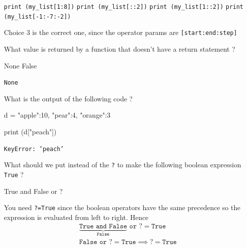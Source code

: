 \documentclass[12pt,a4paper]{exam}
\begin{document}
\begin{questions}
\begin{checkboxes}
\choice \texttt{print (my\_list[1:8])}
\choice \texttt{print (my\_list[::2])}
\choice \texttt{print (my\_list[1::2])}
\choice \texttt{print (my\_list[-1:-7:-2])}
\end{checkboxes}
\begin{solution}
Choice 3 is the correct one, since the operator params are \texttt{[start:end:step]}
\end{solution}
\question
What value is returned by a function that doesn't have a return statement ?

\begin{checkboxes}
\choice None
\choice False
\end{checkboxes}
\begin{solution}
\texttt{None}
\end{solution}
\question
What is the output of the following code ?

\begin{ipython}
d = {"apple":10, "pear":4, "orange":3}

print (d["peach"])
\end{ipython}
\makeemptybox{3cm}
\begin{solution}
\texttt{KeyError: 'peach'}
\end{solution}
\question
What should we put instead of the \texttt{?} to make the following boolean expression \texttt{True} ?
\begin{ipython}
True and False or ?
\end{ipython}
\fillwithlines{3cm}
\begin{solution}
You need \texttt{?=True} since the boolean operators have the same precedence so the expression is evaluated from left to right.
Hence
\begin{equation*}
  \begin{gathered}
    \underbrace{\texttt{True and False}}_{\texttt{False}}\texttt{ or ?} = \texttt{True} \\
    \texttt{False or ?} = \texttt{True} \implies \texttt{?} = \texttt{True} \\
    \end{gathered}
\end{equation*}
\end{solution}


\end{questions}
\end{document}
